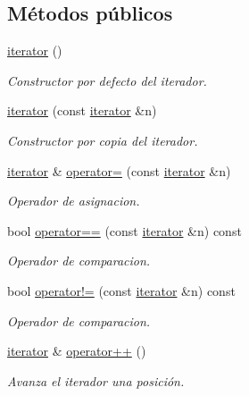\subsection*{Métodos públicos}
\begin{DoxyCompactItemize}
\item 
\mbox{\hyperlink{classstring__map_1_1iterator_adfa11e83ddfb983172d2fb367184c486}{iterator}} ()
\begin{DoxyCompactList}\small\item\em Constructor por defecto del iterador. \end{DoxyCompactList}\item 
\mbox{\hyperlink{classstring__map_1_1iterator_a9421aa5f1c72795f03172f3e0ecd87ca}{iterator}} (const \mbox{\hyperlink{classstring__map_1_1iterator}{iterator}} \&n)
\begin{DoxyCompactList}\small\item\em Constructor por copia del iterador. \end{DoxyCompactList}\item 
\mbox{\hyperlink{classstring__map_1_1iterator}{iterator}} \& \mbox{\hyperlink{classstring__map_1_1iterator_a89370874c0a2a3fcc6b6980851b32525}{operator=}} (const \mbox{\hyperlink{classstring__map_1_1iterator}{iterator}} \&n)
\begin{DoxyCompactList}\small\item\em Operador de asignacion. \end{DoxyCompactList}\item 
bool \mbox{\hyperlink{classstring__map_1_1iterator_a78fea15b5e6288434dbb4876e07b5eaa}{operator==}} (const \mbox{\hyperlink{classstring__map_1_1iterator}{iterator}} \&n) const
\begin{DoxyCompactList}\small\item\em Operador de comparacion. \end{DoxyCompactList}\item 
bool \mbox{\hyperlink{classstring__map_1_1iterator_aabc2350ae8191b4dd7102495893ea66a}{operator!=}} (const \mbox{\hyperlink{classstring__map_1_1iterator}{iterator}} \&n) const
\begin{DoxyCompactList}\small\item\em Operador de comparacion. \end{DoxyCompactList}\item 
\mbox{\hyperlink{classstring__map_1_1iterator}{iterator}} \& \mbox{\hyperlink{classstring__map_1_1iterator_a778cc925cf490cea0d6093a7d477413f}{operator++}} ()
\begin{DoxyCompactList}\small\item\em Avanza el iterador una posición. \end{DoxyCompactList}\item 

\end{DoxyCompactItemize}
